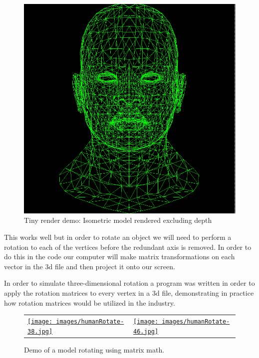 \begin{figure}[ht]\centering %
	\includegraphics[width=\columnwidth/2]{images/TinyrenderSkull.png}
	\caption{Tiny render demo: Isometric model rendered excluding depth}
	\label{fig:wireframe}
\end{figure}

This works well but in order to rotate an object we will need to perform a rotation to each of the vertices before the redundant axis is removed. In order to do this in the code our computer will make matrix transformations on each vector in the 3d file and then project it onto our screen.

In order to simulate three-dimensional rotation a program was written in order to apply the rotation matrices to every vertex in a 3d file, demonstrating in practice how rotation matrices would be utilized in the industry.
\begin{figure}[ht]\centering %
\begin{tabular}{ p{} p{} }
	\href{https://raw.githubusercontent.com/beastr45/MathIA-bear/main/latex/Figures/images/gifs/humanRotate.gif}{\texttt{[image: images/humanRotate-38.jpg]}} & \href{https://raw.githubusercontent.com/beastr45/MathIA-bear/main/latex/Figures/images/gifs/humanRotate.gif}{\texttt{[image: images/humanRotate-46.jpg]}}
\end{tabular}
	\caption{Demo of a model rotating using matrix math.}
	\label{fig:humanGif}
\end{figure}
